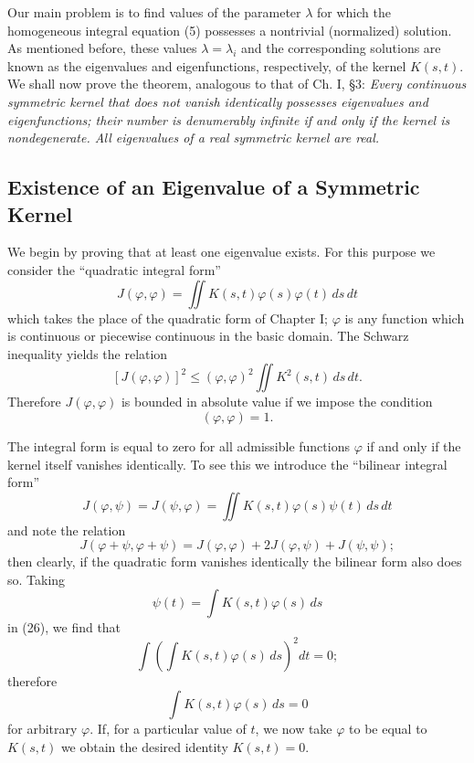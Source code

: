 Our main problem is to find values of the parameter $\lambda$ for which the homogeneous integral equation (5) possesses a nontrivial (normalized) solution. As mentioned before, these values $\lambda=\lambda_i$ and the corresponding solutions are known as the eigenvalues and eigenfunctions, respectively, of the kernel $K(s,t)$. We shall now prove the theorem, analogous to that of Ch. I, \S3: \emph{Every continuous symmetric kernel that does not vanish identically possesses eigenvalues and eigenfunctions; their number is denumerably infinite if and only if the kernel is nondegenerate. All eigenvalues of a real symmetric kernel are real.}

\subsection{Existence of an Eigenvalue of a Symmetric Kernel}
We begin by proving that at least one eigenvalue exists. For this purpose we consider the ``quadratic integral form''
\begin{equation}\tag{24}
J(\varphi,\varphi)=\iint K(s,t)\varphi(s)\varphi(t)\,ds\,dt
\end{equation}
which takes the place of the quadratic form of Chapter I; $\varphi$ is any function which is continuous or piecewise continuous in the basic domain. The Schwarz inequality yields the relation
\[
[J(\varphi,\varphi)]^2\le (\varphi,\varphi)^2\iint K^2(s,t)\,ds\,dt.
\]
Therefore $J(\varphi,\varphi)$ is bounded in absolute value if we impose the condition
\begin{equation}\tag{25}
(\varphi,\varphi)=1.
\end{equation}

The integral form is equal to zero for all admissible functions $\varphi$ if and only if the kernel itself vanishes identically. To see this we introduce the ``bilinear integral form''
\begin{equation}\tag{26}
J(\varphi,\psi)=J(\psi,\varphi)=\iint K(s,t)\varphi(s)\psi(t)\,ds\,dt
\end{equation}
and note the relation
\begin{equation}\tag{27}
J(\varphi+\psi,\varphi+\psi)=J(\varphi,\varphi)+2J(\varphi,\psi)+J(\psi,\psi);
\end{equation}
then clearly, if the quadratic form vanishes identically the bilinear form also does so. Taking
\[
\psi(t)=\int K(s,t)\varphi(s)\,ds
\]
in (26), we find that
\[
\int\left(\int K(s,t)\varphi(s)\,ds\right)^2dt=0;
\]
therefore
\[
\int K(s,t)\varphi(s)\,ds=0
\]
for arbitrary $\varphi$. If, for a particular value of $t$, we now take $\varphi$ to be equal to $K(s,t)$ we obtain the desired identity $K(s,t)=0$.

